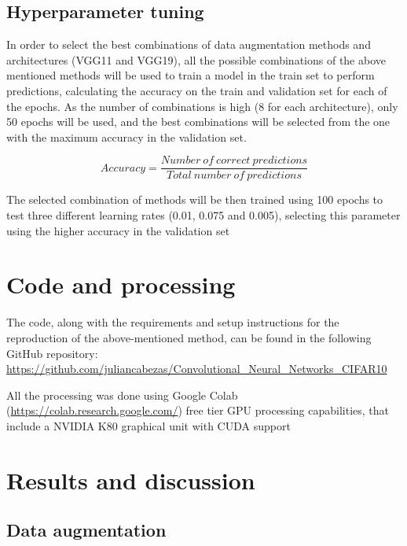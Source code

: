 \documentclass[10pt,twocolumn,letterpaper]{article}
\begin{document}
\subsection{Hyperparameter tuning}

In order to select the best combinations of data augmentation methods and architectures (VGG11 and VGG19), all the possible combinations of the above mentioned methods will be used to train a model in the train set to perform predictions, calculating the accuracy on the train and validation set for each of the epochs. As the number of combinations is high (8 for each architecture), only 50 epochs will be used, and the best combinations will be selected from the one with the maximum accuracy in the validation set.

\begin{equation}
	Accuracy = \frac{Number \: of \: correct \: predictions}{Total\: number\: of\: predictions}
\end{equation}

The selected combination of methods will be then trained using 100 epochs to test three different learning rates (0.01, 0.075 and 0.005), selecting this parameter using the higher accuracy in the validation set

\section{Code and processing}

The code, along with the requirements and setup instructions for the reproduction of the above-mentioned method, can be found in the following GitHub repository: \url{https://github.com/juliancabezas/Convolutional_Neural_Networks_CIFAR10} 

All the processing was done using Google Colab (\url{https://colab.research.google.com/}) free tier GPU processing capabilities, that include a NVIDIA K80 graphical unit with CUDA support

\section{Results and discussion}

\subsection{Data augmentation}
\end{document}
